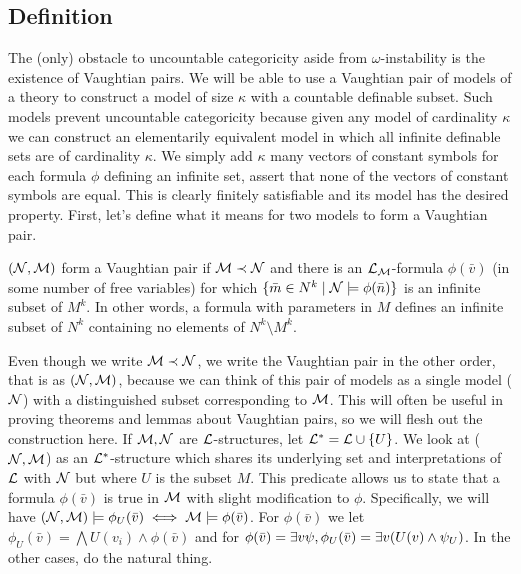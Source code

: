 \subsection{Definition}
The (only) obstacle to uncountable categoricity aside from \(\omega\)-instability is the existence of Vaughtian pairs. %
We will be able to use a Vaughtian pair of models of a theory to construct a model of size \(\kappa\) with a countable definable subset.  
Such models prevent uncountable categoricity because given any model of cardinality \(\kappa\) we can construct an elementarily equivalent model in which all infinite definable sets are of cardinality \(\kappa\).
We simply add \(\kappa\) many vectors of constant symbols for each formula \(\phi\) defining an infinite set, assert that none of the vectors of constant symbols are equal. This is clearly finitely satisfiable and its model has the desired property.
First, let's define what it means for two models to form a Vaughtian pair. %

\begin{definition}\label{definition_vaughtian_pairs}
\((\mathcal{N}, \mathcal{M})\) form a Vaughtian pair if \(\mathcal{M} \prec \mathcal{N}\) and there is an \(\mathcal{L}_{\mathcal{M}}\)-formula \(\phi(\bar{v})\) (in some number of free variables) for which
\(\{\bar{m} \in N^k \mid \mathcal{N} \models \phi(\bar{n})\}\) is an infinite subset of \(M^k\). %
In other words, a formula with parameters in \(M\) defines an infinite subset of \(N^k\) containing no elements of \(N^k \setminus M^k\).
\end{definition}

Even though we write \(\mathcal{M} \prec \mathcal{N}\), we write the Vaughtian pair in the other order, that is as \((\mathcal{N}, \mathcal{M})\), because we can think of this pair of models as a single model (\(\mathcal{N}\)) with a distinguished subset corresponding to \(\mathcal{M}\).
This will often be useful in proving theorems and lemmas about Vaughtian pairs, so we will flesh out the construction here. 
If \(\mathcal{M}, \mathcal{N}\) are \(\mathcal{L}\)-structures, let  \(\mathcal{L}^* = \mathcal{L} \cup \{U\}\). 
We look at (\(\mathcal{N}, \mathcal{M}\)) as an \(\mathcal{L}^*\)-structure which shares its underlying set and interpretations of \(\mathcal{L}\) with \(\mathcal{N}\) but where \(U\) is the subset \(M\). 
This predicate allows us to state that a formula \(\phi(\bar{v})\) is true in \(\mathcal{M}\) with slight modification to \(\phi\).
Specifically, we will have \((\mathcal{N}, \mathcal{M}) \models \phi_U(\bar{v}) \iff \mathcal{M} \models \phi(\bar{v})\).
For \(\phi(\bar{v})\) \qf we let \(\phi_U(\bar{v}) = \bigwedge U(v_i) \land \phi(\bar{v})\) and for \(\phi(\bar{v}) = \exists v \psi, \phi_U(\bar{v}) = \exists v (U(v) \land \psi_U)\). 
In the other cases, do the natural thing. %

